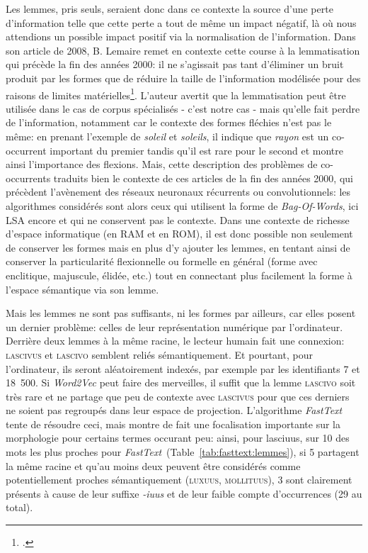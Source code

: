 Les lemmes, pris seuls, seraient donc dans ce contexte la source d'une perte d'information telle que cette perte a tout de même un impact négatif, là où nous attendions un possible impact positif via la normalisation de l'information. Dans son article de 2008, B. Lemaire remet en contexte cette course à la lemmatisation qui précède la fin des années 2000: il ne s'agissait pas tant d'éliminer un bruit produit par les formes que de réduire la taille de l'information modélisée pour des raisons de limites matérielles\footcite[p. 1]{lemaire_limites_2008}. L'auteur avertit que la lemmatisation peut être utilisée dans le cas de corpus spécialisés - c'est notre cas - mais qu'elle fait perdre de l'information, notamment car le contexte des formes fléchies n'est pas le même: en prenant l'exemple de \textit{soleil} et \textit{soleils}, il indique que \textit{rayon} est un co-occurrent important du premier tandis qu'il est rare pour le second et montre ainsi l'importance des flexions. Mais, cette description des problèmes de co-occurrents traduits bien le contexte de ces articles de la fin des années 2000, qui précèdent l'avènement des réseaux neuronaux récurrents ou convolutionnels: les algorithmes considérés sont alors ceux qui utilisent la forme de \textit{Bag-Of-Words}, ici LSA encore et qui ne conservent pas le contexte. Dans une contexte de richesse d'espace informatique (en RAM et en ROM), il est donc possible non seulement de conserver les formes mais en plus d'y ajouter les lemmes, en tentant ainsi de conserver la particularité flexionnelle ou formelle en général (forme avec enclitique, majuscule, élidée, etc.) tout en connectant plus facilement la forme à l'espace sémantique via son lemme.

Mais les lemmes ne sont pas suffisants, ni les formes par ailleurs, car elles posent un dernier problème: celles de leur représentation numérique par l'ordinateur. Derrière deux lemmes à la même racine, le lecteur humain fait une connexion: \textsc{lascivus} et \textsc{lascivo} semblent reliés sémantiquement. Et pourtant, pour l'ordinateur, ils seront aléatoirement indexés, par exemple par les identifiants 7 et 18~500. Si \textit{Word2Vec} peut faire des merveilles, il suffit que la lemme \textsc{lascivo} soit très rare et ne partage que peu de contexte avec \textsc{lascivus} pour que ces derniers ne soient pas regroupés dans leur espace de projection. L'algorithme \textit{FastText} tente de résoudre ceci, mais montre de fait une focalisation importante sur la morphologie pour certains termes occurant peu: ainsi, pour lasciuus, sur 10 des mots les plus proches pour \textit{FastText}~(Table~\ref{tab:fasttext:lemmes}), si 5 partagent la même racine et qu'au moins deux peuvent être considérés comme potentiellement proches sémantiquement (\textsc{luxuus, mollituus}), 3 sont clairement présents à cause de leur suffixe \textit{-iuus} et de leur faible compte d'occurrences (29 au total).


